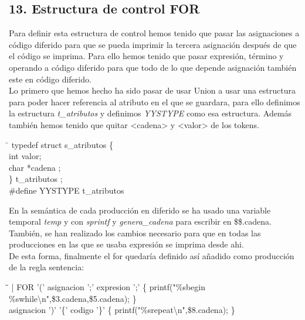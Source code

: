 \documentclass[11pt,spanish]{article}
\begin{document}
		\subsection*{13. Estructura de control FOR }
		\label{subsec:13}
		Para definir esta estructura de control hemos tenido que pasar las asignaciones a código diferido para que se pueda imprimir la tercera asignación después de que el código se imprima. Para ello hemos tenido que pasar expresión, término y operando a código diferido para que todo de lo que depende asignación también este en código diferido.\\
		Lo primero que hemos hecho ha sido pasar de usar Union a usar una estructura para poder hacer referencia al atributo en el que se guardara, para ello definimos la estructura \textit{t\_atributos} y definimos \textit{YYSTYPE} como esa estructura. Además también hemos tenido que quitar <cadena> y <valor> de los tokens.
		\begin{tcolorbox}
		\begin{tabbing}
			\hspace*{1cm}\=\kill
			typedef struct s\_atributos \{ \\
			\>	int valor;\\
			\>	char *cadena ;\\
			\} t\_atributos ; \\
			\#define YYSTYPE t\_atributos 
		\end{tabbing}
		\end{tcolorbox}
		En la semántica de cada producción en diferido se ha usado una variable temporal \textit {temp} y con \textit{sprintf} y \textit{genera\_cadena} para escribir en \$\$.cadena. También, se han realizado los cambios necesario para que en todas las producciones en las que se usaba expresión se imprima desde ahi.\\
		De esta forma, finalmente el for quedaría definido así añadido como producción de la regla sentencia:
		\begin{tcolorbox}
		\begin{tabbing}
			\hspace*{1cm}\= \hspace*{5.5cm}\=\kill	
			| FOR '(' asignacion ';' expresion ';'\>\>			\{ printf("\%sbegin \%swhile\textbackslash n",\$3.cadena,\$5.cadena); \}\\
			\>asignacion ')' '\{' codigo '\}'\>				\{ printf("\%srepeat\textbackslash n",\$8.cadena); \}
		\end{tabbing}
		\end{tcolorbox}
\end{document}
